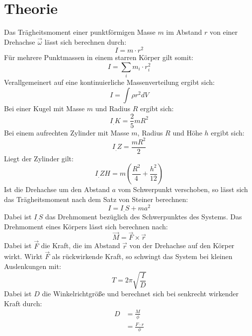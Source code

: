 
\section{Theorie}
\label{sec:Theorie}

Das Trägheitsmoment einer punktförmigen Masse $m$ im Abstand $r$ von einer Drehachse $\vec{\omega}$ lässt sich berechnen durch:
\begin{equation}
I = m\cdot r^2 
\end{equation}
Für mehrere Punktmassen in einem starren Körper gilt somit:
\begin{equation}
I = \sum_i m_i\cdot r_i^2\label{eq:I_S}
\end{equation}
Verallgemeinert auf eine kontinuierliche Massenverteilung ergibt sich:
\begin{equation}
I = \int \rho r^2 dV \label{eq:I_S2}
\end{equation}
Bei einer Kugel mit Masse $m$ und Radius $R$ ergibt sich:
\begin{equation}
I_.{K} = \frac{2}{5}mR^2 \label{eq:I_SK}
\end{equation}
Bei einem aufrechten Zylinder mit Masse $m$, Radius $R$ und Höhe $h$ ergibt sich:
\begin{equation}
I_.{Z} = \frac{mR^2}{2} \label{eq:I_SZ}
\end{equation}
Liegt der Zylinder gilt:
\begin{equation}
I_.{ZH} = m\left(\frac{R^2}{4}+\frac{h^2}{12}\right) \label{eq:I_SZH}
\end{equation}
Ist die Drehachse um den Abstand $a$ vom Schwerpunkt verschoben, so lässt sich das Trägheitsmoment nach dem Satz von Steiner berechnen:
\begin{equation}
I = I_.S+m a^2 \label{eq:Satz von Steiner}
\end{equation}
Dabei ist $I_.S$ das Drehmoment bezüglich des Schwerpunktes des Systems. Das Drehmoment eines Körpers lässt sich berechnen nach:
\begin{equation}
\vec{M} = \vec{F}\times\vec{r} \label{eq;M}
\end{equation}
Dabei ist $\vec{F}$ die Kraft, die im Abstand $\vec{r}$ von der Drehachse auf den Körper wirkt. Wirkt $\vec{F}$ als rückwirkende Kraft, so schwingt das System bei kleinen Auslenkungen mit:
\begin{equation}
T = 2\pi\sqrt{\frac{I}{D}} \label{eq:T}
\end{equation}
Dabei ist $D$ die Winkelrichtgröße und berechnet sich bei senkrecht wirkender Kraft durch: 
\begin{align}
D 	&= \frac{M}{\phi}\nonumber\\ 
	&= \frac{F\cdot r}{\phi} \label{eq:D}
\end{align}

